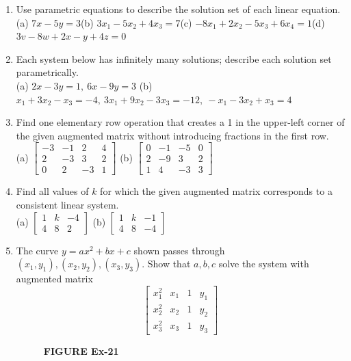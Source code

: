 \documentclass{article}
\theoremstyle{mystyle}
\begin{document}
\begin{enumerate}
    \item[13.] Use parametric equations to describe the solution set of each linear equation.\\
    (a) $7x-5y=3$\quad (b) $3x_1-5x_2+4x_3=7$\quad (c) $-8x_1+2x_2-5x_3+6x_4=1$\quad (d) $3v-8w+2x-y+4z=0$

    \item[15.] Each system below has infinitely many solutions; describe each solution set parametrically.\\
    (a) $2x-3y=1,\ 6x-9y=3$\qquad
    (b) $x_1+3x_2-x_3=-4,\ 3x_1+9x_2-3x_3=-12,\ -x_1-3x_2+x_3=4$

    \item[17.] Find one elementary row operation that creates a 1 in the upper-left corner of the given augmented matrix without introducing fractions in the first row.\\
    (a) $\begin{bmatrix}-3&-1&2&4\\2&-3&3&2\\0&2&-3&1\end{bmatrix}$\qquad
    (b) $\begin{bmatrix}0&-1&-5&0\\2&-9&3&2\\1&4&-3&3\end{bmatrix}$

    \item[19.] Find all values of $k$ for which the given augmented matrix corresponds to a consistent linear system.\\
    (a) $\begin{bmatrix}1&k&-4\\4&8&2\end{bmatrix}$\qquad
    (b) $\begin{bmatrix}1&k&-1\\4&8&-4\end{bmatrix}$

    \item[21.] The curve $y=ax^2+bx+c$ shown passes through $(x_1,y_1),(x_2,y_2),(x_3,y_3)$. Show that $a,b,c$ solve the system with augmented matrix
    \[
    \begin{bmatrix} x_1^2&x_1&1&y_1\\ x_2^2&x_2&1&y_2\\ x_3^2&x_3&1&y_3\end{bmatrix}
    \]
    \begin{figure}[h]
    \centering
    \caption*{\textbf{FIGURE Ex-21}}
    \end{figure}


\end{enumerate}
\end{document}
